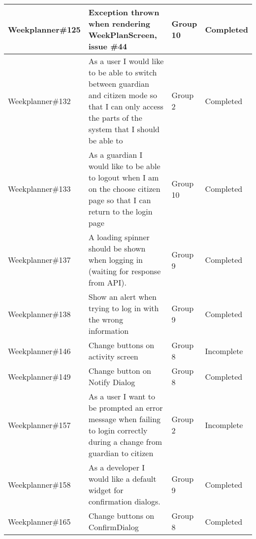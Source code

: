 \begin{longtable}{|p{2.9cm}|p{7cm}|p{2cm}|p{2cm}|}
    Weekplanner\#125 & Exception thrown when rendering WeekPlanScreen, issue \#44                                                                                                                             & Group 10      & Completed   \\ \hline
    Weekplanner\#132 & As a user I would like to be able to switch between guardian and citizen mode so that I can only access the parts of the system that I should be able to                            & Group 2          & Completed    \\ \hline
    Weekplanner\#133 & As a guardian I would like to be able to logout when I am on the choose citizen page so that I can return to the login page                                                              & Group 10    & Completed    \\ \hline
    Weekplanner\#137 & A loading spinner should be shown when logging in (waiting for response from API).                                                                                                    & Group 9        & Completed     \\ \hline
    Weekplanner\#138 & Show an alert when trying to log in with the wrong information                                                                                                                         & Group 9       & Completed    \\ \hline
    Weekplanner\#146 & Change buttons on activity screen                                                                                                                                                    & Group 8         & Incomplete    \\ \hline
    Weekplanner\#149 & Change button on Notify Dialog                                                                                                                                                        & Group 8        & Completed    \\ \hline
    Weekplanner\#157 & As a user I want to be prompted an error message when failing to login correctly during a change from guardian to citizen                                                             & Group 2        & Incomplete    \\ \hline
    Weekplanner\#158 & As a developer I would like a default widget for confirmation dialogs.                                                                                                                  & Group 9      & Completed    \\ \hline
    Weekplanner\#165 & Change buttons on ConfirmDialog                                                                                                                                                        & Group 8       & Completed    \\ \hline

\end{longtable}
